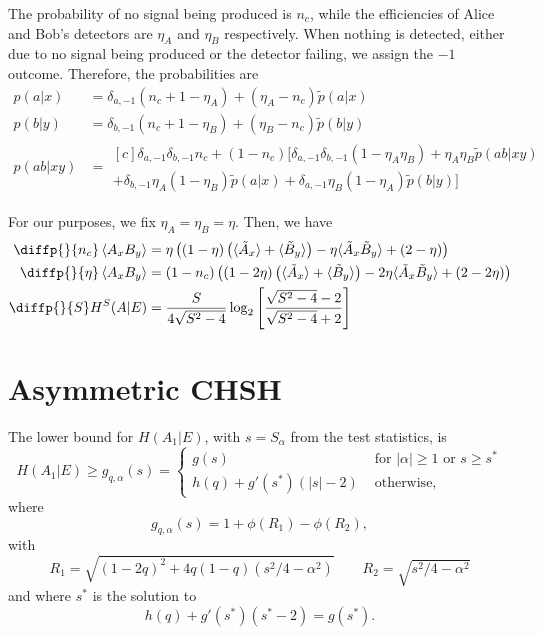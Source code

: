 \documentclass[10pt, a4paper]{article}
\newcommand{\abs}[1]{\left\lvert#1\right\rvert}
\newcommand{\?}{\mathrel{?}} %
\newcommand{\angleb}[1]{\left\langle #1 \right\rangle} %
\numberwithin{equation}{section} %
\theoremstyle{definition}
\theoremstyle{plain}
\theoremstyle{plain}
\begin{document}
    The probability of no signal being produced is \(n_c\), while the efficiencies of Alice and Bob's detectors are \(\eta_A\) and \(\eta_B\) respectively. When nothing is detected, either due to no signal being produced or the detector failing, we assign the \(-1\) outcome. Therefore, the probabilities are
    \begin{align*}
      p(a|x) &= \delta_{a,-1}(n_c + 1 - \eta_A) + (\eta_A - n_c)\tilde{p}(a|x) \\
      p(b|y) &= \delta_{b,-1}(n_c + 1 - \eta_B) + (\eta_B - n_c)\tilde{p}(b|y) \\
      p(ab|xy) &= \begin{aligned}[c] \delta_{a,-1}\delta_{b,-1}n_c + (1-n_c) [ \delta_{a,-1} \delta_{b,-1}(1-\eta_A\eta_B) + \eta_A\eta_B \tilde{p}(ab|xy) \\
        + \delta_{b,-1}\eta_A(1-\eta_B)\tilde{p}(a|x) + \delta_{a,-1}\eta_B(1-\eta_A)\tilde{p}(b|y) ] 
      \end{aligned}
    \end{align*}

    For our purposes, we fix \(\eta_A = \eta_B = \eta\). Then, we have
    \begin{align*}
      \diffp{}{{n_c}} \angleb{A_x B_y} &= \eta \left( \left(1-\eta\right) \left(\langle\tilde{A}_x\rangle + \langle\tilde{B}_y\rangle\right) - \eta \langle\tilde{A}_x\tilde{B}_y\rangle + \left(2 - \eta\right) \right) \\
      \diffp{}{{\eta}} \angleb{A_x B_y} &= \left(1 - n_{c}\right) \left( \left(1-2\eta\right) \left(\langle\tilde{A}_x\rangle+\langle\tilde{B}_y\rangle\right) - 2\eta \langle\tilde{A}_x\tilde{B}_y\rangle + (2-2\eta) \right) \\
      \diffp{}{S} H^S(A|E) &= \frac{S}{4\sqrt{S^2-4}} \log_2 \left[ \frac{\sqrt{S^2-4}-2}{\sqrt{S^2-4}+2} \right]
    \end{align*}

    \section{Asymmetric CHSH}

    The lower bound for \(H(A_1|E)\), with \(s = S_{\alpha}\) from the test statistics, is
    \[ H(A_1|E) \geq g_{q,\alpha}(s) = \begin{cases}
      g(s) & \text{ for } \abs{\alpha} \geq 1 \text{ or } s \geq s^* \\
      h(q) + g'(s^*)(\abs{s}-2) & \text{ otherwise},
    \end{cases}
    \]
    where
    \begin{equation}
      g_{q,\alpha}(s) = 1 + \phi\left(R_1\right) - \phi\left(R_2\right),
    \end{equation}
    with
    \begin{equation} 
      R_1 = \sqrt{{(1-2q)}^2 + 4q(1-q)(s^2/4-\alpha^2)} \qquad R_2 = \sqrt{s^2/4-\alpha^2}
    \end{equation}
    and where \(s^*\) is the solution to
    \begin{equation}
      h(q) + g'(s^*) (s^*-2) = g(s^*).
    \end{equation}
\end{document}
